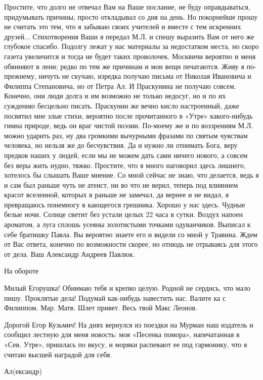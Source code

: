 \documentclass[]{memoir}
\begin{document}
Простите, что долго не отвечал Вам на Ваше послание, не буду оправдываться, придумывать причины, просто откладывал со дня на день. Но покорнейше прошу не считать это тем, что я забываю своих учителей и вместе с тем искренних друзей...  Стихотворения Ваши я передал М.Л. и спешу выразить Вам от него же глубокое спасибо. Подолгу лежат у нас материалы за недостатком места, но скоро газета увеличится и тогда не будет таких проволочек. Москвичи вероятно и меня обвиняют в лени; редко по тем же причинам и мои вещи печатаются. Живу я по-прежнему, ничуть не скучаю, изредка получаю письма от Николая Ивановича и Филиппа Степановича, но от Петра Ал. И Праскунина не получаю совсем. Конечно, они люди долга и им возможно не только недосуг, но и по их суждению бесцельно писать.
Праскунин же вечно кисло настроенный, даже посвятил мне злые стихи, вероятно после прочитанного в «Утре» какого-нибудь гимна природе, ведь он враг чистой поэзии. По-моему же и по воззрениям М.Л. можно ударить раз, ну два громкими вычурными фразами по святым чувствам человека, но нельзя же до бесчувствия. Да и нужно ли отнимать Бога, веру предков наших у людей, если мы не можем дать сами ничего нового, а совсем без веры жить нудно, тяжко.
Простите, что я много наговорил здесь лишнего, хотелось бы слышать Ваше мнение.
Со мной сейчас не знаю, что делается, ведь я и сам был раньше чуть не атеист, ни во что не верил, теперь под влиянием красот вселенной, которых я раньше не замечал, да вернее и не видал, я превращаюсь понемногу в кающегося грешника.
Хорошо у нас здесь. Чудные белые ночи. Солнце светит без устали целых 22 часа в сутки. Воздух напоен ароматом, а луга сплошь усеяны золотистыми точками одуванчиков.
Выписал к себе братишку Павла. Вы вероятно знаете его и видели со мной у Травина.
Ждем от Вас ответа, конечно по возможности скорее, но отнюдь не отрываясь для этого от дела.
              Ваш Александр Андреев Павлюк.

                                               На обороте


Милый Егорушка! Обнимаю тебя и крепко целую. Родной не сердись, что мало пишу. Проклятые дела! Подумай как-нибудь навестить нас. Валите ка с Филиппом.
  Мар. Матв. Шлет привет.
  Весь твой Макс Леонов.

Дорогой Егор Кузьмич!
На днях вернулся из поездки на Мурман наш издатель и сообщил лестную для меня новость: моя «Песенка помора», напечатанная в «Сев. Утре», пришлась по вкусу, и моряки распевают ее под гармонику, что я считаю высшей наградой для себя.

Ал(ександр)
\end{document}
